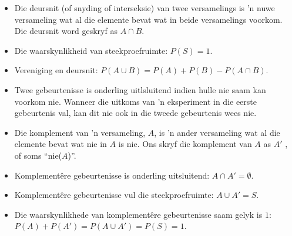 \begin{itemize}
\item Die deursnit (of snyding of interseksie) van twee versamelings is ’n nuwe versameling
wat al die elemente bevat wat in beide versamelings voorkom. Die deursnit word
geskryf as
 $A \cap B$.

\item Die waarskynlikheid van steekproefruimte:  $P(S)=1$.

\item Vereniging en deursnit: $P(A \cup B) = P(A) + P(B) - P(A \cap B)$.


\item Twee gebeurtenisse is onderling uitlsluitend indien hulle nie saam kan voorkom
nie. Wanneer die uitkoms van ’n eksperiment in die eerste gebeurtenis val, kan dit nie
ook in die tweede gebeurtenis wees nie.



\item Die komplement van ’n versameling, $A$, is ’n ander versameling wat al die elemente
bevat wat nie in $A$ is nie. Ons skryf die komplement van $A$ as $A'$ , of soms “nie($A$)”.


\item Komplementêre gebeurtenisse is onderling uitsluitend: $A \cap A' = \emptyset$.


\item Komplementêre gebeurtenisse vul die steekproefruimte:
$A \cup A' = S$.


\item Die waarskynlikhede van komplementêre gebeurtenisse
saam gelyk is
 $1$: $P(A) + P(A') = P(A \cup A') = P(S) = 1$.

\end{itemize}
